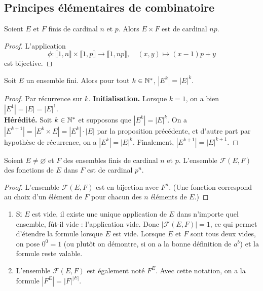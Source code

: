 \subsection{Principes élémentaires de combinatoire}

\begin{proposition}
Soient $E$ et $F$ finis de cardinal $n$ et $p$. Alors $E\times F$ est de cardinal $np$.
\end{proposition}
\begin{proof}
L'application 
\[
\phi : \llbracket 1,n\rrbracket \times \llbracket 1,p\rrbracket\to \llbracket 1,np\rrbracket,\quad
(x,y)\mapsto (x-1)p+y
\]
est bijective.
\end{proof}
\begin{corollaire}
Soit $E$ un ensemble fini. Alors pour tout $k\in \mathbb{N}^*$, $|E^k|=|E|^k$.
\end{corollaire}
\begin{proof}
Par récurrence sur $k$. 
\textbf{Initialisation. }Lorsque $k=1$, on a bien  $|E^1|=|E|=|E|^1$.\\
\textbf{Hérédité.} Soit $k\in \mathbb{N}^*$ et supposons que $|E^k|=|E|^k$.
On a $|E^{k+1}| = |E^k\times E|=|E^k|\cdot |E|$ par la proposition précédente, et d'autre part par hypothèse de récurrence, on a $|E^k|=|E|^k$. Finalement,  $|E^{k+1}|=|E|^{k+1}$. 
\end{proof}

\begin{corollaire}
Soient $E\neq \varnothing$ et $F$ des ensembles finis de cardinal  $n$ et $p$. L'ensemble $\mathcal F(E,F)$ des fonctions de $E$ dans $F$ est de cardinal $p^n$. 
\end{corollaire}
\begin{proof}
L'ensemble $\mathcal F(E,F)$ est en bijection avec $F^n$. (Une fonction correspond au choix d'un élément de $F$ pour chacun des $n$ éléments de $E$.) 
\end{proof}

\begin{remarque}
\begin{enumerate}
\item Si $E$ est vide, il existe une unique application de $E$ dans n'importe quel ensemble, fût-il vide : l'application vide. Donc $|\mathcal F(E,F)|=1$, ce qui permet d'étendre la formule lorsque $E$ est vide. Lorsque $E$ et $F$ sont tous deux vides, on pose $0^0=1$ (ou plutôt on démontre, si on a la \og bonne\fg{} définition de $a^b$) et la formule reste valable.
\item L'ensemble $\mathcal F(E,F)$ est également noté $F^E$. Avec cette notation, on a la formule $\left| F^E\right| = |F|^{|E|}$.
\end{enumerate}
\end{remarque}


